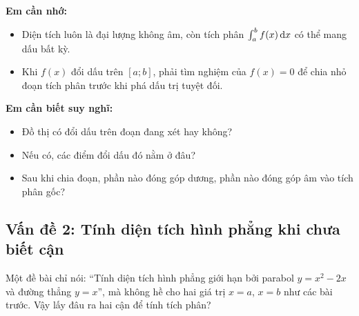 \begin{hoptongket}
\textbf{Em cần nhớ:}
\begin{itemize}[leftmargin=1cm]
  \item Diện tích luôn là đại lượng không âm, còn tích phân $\int_a^b f(x)\,\mathrm{d}x$ có thể mang dấu bất kỳ.
  \item Khi $f(x)$ đổi dấu trên $[a;b]$, phải tìm nghiệm của $f(x)=0$ để chia nhỏ đoạn tích phân trước khi phá dấu trị tuyệt đối.
\end{itemize}
\textbf{Em cần biết suy nghĩ:}
\begin{itemize}[leftmargin=1cm]
  \item Đồ thị có đổi dấu trên đoạn đang xét hay không?
  \item Nếu có, các điểm đổi dấu đó nằm ở đâu?
  \item Sau khi chia đoạn, phần nào đóng góp dương, phần nào đóng góp âm vào tích phân gốc?
\end{itemize}
\end{hoptongket}

\subsection{Vấn đề 2: Tính diện tích hình phẳng khi chưa biết cận}

\begin{hopkhampha}
Một đề bài chỉ nói: ``Tính diện tích hình phẳng giới hạn bởi parabol $y=x^2-2x$ và đường thẳng $y=x$'', mà không hề cho hai giá trị $x=a$, $x=b$ như các bài trước. Vậy lấy đâu ra hai cận để tính tích phân?
\end{hopkhampha}

